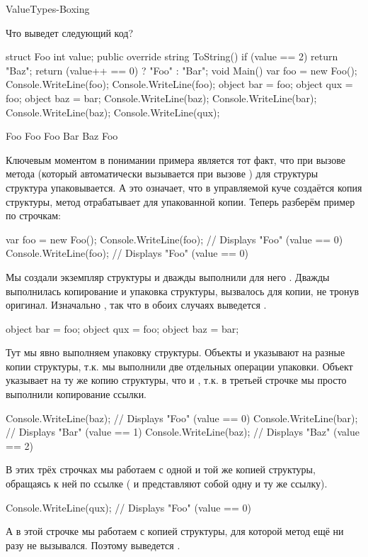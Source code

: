 \begin{defproblem}{ValueTypes-Boxing}
\begin{onlyproblem}
  Что выведет следующий код?
  \begin{source}
  struct Foo
  {   
    int value;
    public override string ToString()
    { 
      if (value == 2)
        return "Baz";
      return (value++ == 0) ? "Foo" : "Bar";
    }
  }
  void Main()
  { 
    var foo = new Foo();
    Console.WriteLine(foo);
    Console.WriteLine(foo);
    object bar = foo;
    object qux = foo;
    object baz = bar;
    Console.WriteLine(baz);
    Console.WriteLine(bar);
    Console.WriteLine(baz);
    Console.WriteLine(qux);
  }
  \end{source}
\end{onlyproblem}
\begin{onlysolution}
  \begin{source}
  Foo
  Foo
  Foo
  Bar
  Baz
  Foo
  \end{source}
  Ключевым моментом в понимании примера является тот факт, что при вызове метода  (который автоматически вызывается при вызове ) для структуры  структура упаковывается. А это означает, что в управляемой куче создаётся копия структуры, метод  отрабатывает для упакованной копии. Теперь разберём пример по строчкам:
  \begin{source}
  var foo = new Foo();
  Console.WriteLine(foo); // Displays "Foo" (value == 0)
  Console.WriteLine(foo); // Displays "Foo" (value == 0)
  \end{source}
  Мы создали экземпляр структуры  и дважды выполнили для него . Дважды выполнилась копирование и упаковка структуры,  вызвалось для копии, не тронув оригинал. Изначально , так что в обоих случаях выведется .
  \begin{source}
  object bar = foo;
  object qux = foo;
  object baz = bar;
  \end{source}
  Тут мы явно выполняем упаковку структуры. Объекты  и  указывают на разные копии структуры, т.к. мы выполнили две отдельных операции упаковки. Объект  указывает на ту же копию структуры, что и , т.к. в третьей строчке мы просто выполнили копирование ссылки.
  \begin{source}
  Console.WriteLine(baz); // Displays "Foo" (value == 0)
  Console.WriteLine(bar); // Displays "Bar" (value == 1)
  Console.WriteLine(baz); // Displays "Baz" (value == 2)
  \end{source}
  В этих трёх строчках мы работаем с одной и той же копией структуры, обращаясь к ней по ссылке ( и  представляют собой одну и ту же ссылку).
  \begin{source}
  Console.WriteLine(qux); // Displays "Foo" (value == 0)
  \end{source}
  А в этой строчке мы работаем с копией структуры, для которой метод  ещё ни разу не вызывался. Поэтому выведется .
\end{onlysolution}
\end{defproblem}
